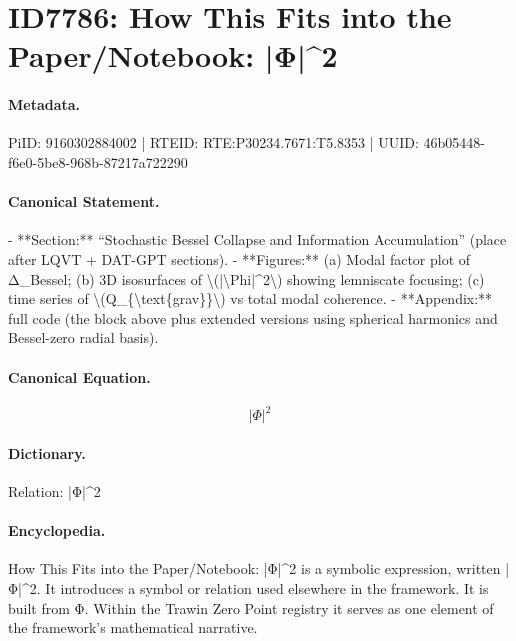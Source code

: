 \section*{ID7786: How This Fits into the Paper/Notebook: |Φ|\textasciicircum{}2}
\paragraph{Metadata.}
PiID: 9160302884002 | RTEID: RTE:P30234.7671:T5.8353 | UUID: 46b05448-f6e0-5be8-968b-87217a722290

\paragraph{Canonical Statement.}
- **Section:** “Stochastic Bessel Collapse and Information Accumulation” (place after LQVT + DAT-GPT sections). - **Figures:** (a) Modal factor plot of Δ\_Bessel; (b) 3D isosurfaces of \textbackslash{}(|\textbackslash{}Phi|\textasciicircum{}2\textbackslash{}) showing lemniscate focusing; (c) time series of \textbackslash{}(Q\_\{\textbackslash{}text\{grav\}\}\textbackslash{}) vs total modal coherence. - **Appendix:** full code (the block above plus extended versions using spherical harmonics and Bessel-zero radial basis).

\paragraph{Canonical Equation.}
\[
|\Phi|^2
\]

\paragraph{Dictionary.}
Relation: |Φ|\textasciicircum{}2

\paragraph{Encyclopedia.}
How This Fits into the Paper/Notebook: |Φ|\textasciicircum{}2 is a symbolic expression, written |Φ|\textasciicircum{}2. It introduces a symbol or relation used elsewhere in the framework. It is built from Φ. Within the Trawin Zero Point registry it serves as one element of the framework's mathematical narrative.
